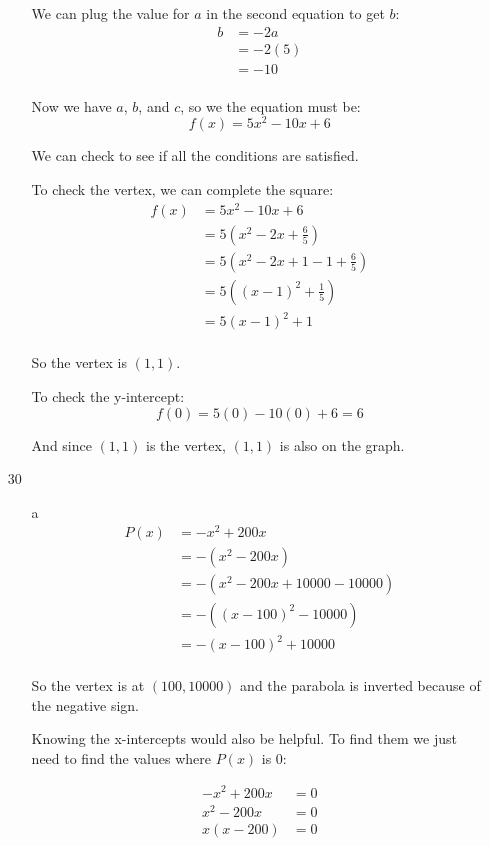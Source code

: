 \documentclass[fleqn,addpoints]{exam}
\begin{document}
\begin{itemize}
\begin{itemize}
We can plug the value for $a$ in the second equation to get $b$:
\begin{align*}
  b &= -2a \\
    &= -2(5) \\
    &= -10 \\
\end{align*}

Now we have $a$, $b$, and $c$, so we the equation must be:
\[
  f(x) = 5x^2 - 10x + 6
\]

We can check to see if all the conditions are satisfied.  

To check the vertex, we can complete the square:
\begin{align*}
  f(x) &= 5x^2 - 10x + 6 \\
       &= 5(x^2 - 2x + \frac{6}{5}) \\
       &= 5(x^2 - 2x + 1 - 1 + \frac{6}{5}) \\
       &= 5((x- 1)^2 + \frac{1}{5}) \\
       &= 5(x- 1)^2 + 1 \\
\end{align*}

So the vertex is $(1, 1)$.

To check the y-intercept:
\[
  f(0) = 5(0) - 10(0) + 6 = 6
\]

And since $(1, 1)$ is the vertex, $(1, 1)$ is also on the graph.

\end{itemize}

\item[30]

\begin{itemize}

\item[a]
\begin{align*}
  P(x) &= -x^2 + 200x \\
       &= -(x^2 - 200x) \\
       &= -(x^2 - 200x + 10000 - 10000) \\
       &= -((x - 100)^2 - 10000) \\
       &= -(x - 100)^2 + 10000 \\
\end{align*}

So the vertex is at $(100, 10000)$ and the parabola is inverted because of the negative sign.

Knowing the x-intercepts would also be helpful.  To find them we just need to find the values where $P(x)$ is 0:

\begin{align*}
   -x^2 + 200x &= 0 \\
   x^2 - 200x &= 0 \\
   x(x - 200) &= 0 \\
\end{align*}


\end{itemize}
\end{itemize}
\end{document}
